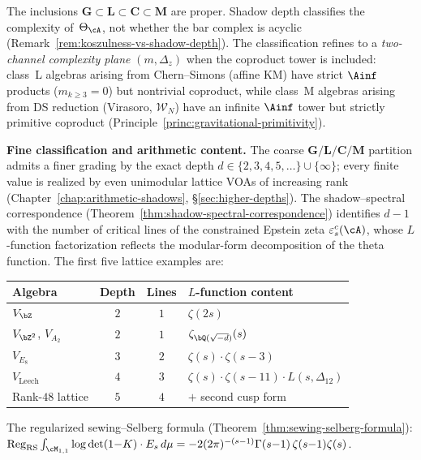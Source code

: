 \noindent
The inclusions $\mathbf{G} \subset \mathbf{L} \subset
\mathbf{C} \subset \mathbf{M}$ are proper. Shadow depth
classifies the complexity of~$\Theta_\cA$, not whether the
bar complex is acyclic
(Remark~\ref{rem:koszulness-vs-shadow-depth}).
The classification refines to a \emph{two-channel complexity plane}
$(m, \Delta_z)$ when the coproduct tower is included: class~L
algebras arising from Chern--Simons (affine KM) have strict
$\Ainf$ products ($m_{k \ge 3} = 0$) but nontrivial coproduct,
while class~M algebras arising from DS reduction (Virasoro,
$\mathcal{W}_N$) have an infinite $\Ainf$ tower but strictly
primitive coproduct
(Principle~\ref{princ:gravitational-primitivity}).

\medskip\noindent\textbf{Fine classification and arithmetic content.}
The coarse $\mathbf{G}/\mathbf{L}/\mathbf{C}/\mathbf{M}$
partition admits a finer grading by the exact depth
$d\in\{2,3,4,5,\ldots\}\cup\{\infty\}$; every finite value
is realized by even unimodular lattice VOAs of increasing rank
(Chapter~\ref{chap:arithmetic-shadows},
\S\ref{sec:higher-depths}). The shadow--spectral correspondence
(Theorem~\ref{thm:shadow-spectral-correspondence}) identifies
$d-1$ with the number of critical lines of the constrained
Epstein zeta $\varepsilon^c_s(\cA)$, whose $L$-function
factorization reflects the modular-form decomposition of the
theta function. The first five lattice examples are:

\begin{center}
\small
\renewcommand{\arraystretch}{1.1}
\begin{tabular}{@{}lccl@{}}
\toprule
\textbf{Algebra} & \textbf{Depth} & \textbf{Lines}
 & \textbf{$L$-function content} \\
\midrule
$V_{\bZ}$ & $2$ & $1$ & $\zeta(2s)$ \\
$V_{\bZ^2}$, $V_{A_2}$ & $2$ & $1$
 & $\zeta_{\bQ(\sqrt{-d})}(s)$ \\
$V_{E_8}$ & $3$ & $2$
 & $\zeta(s)\cdot\zeta(s{-}3)$ \\
$V_{\mathrm{Leech}}$ & $4$ & $3$
 & $\zeta(s)\cdot\zeta(s{-}11)\cdot L(s,\Delta_{12})$ \\
Rank-$48$ lattice & $5$ & $4$
 & $+$ second cusp form \\
\bottomrule
\end{tabular}
\end{center}

\noindent
The regularized sewing--Selberg formula
(Theorem~\ref{thm:sewing-selberg-formula}):
$\operatorname*{Reg}_{\mathrm{RS}}
\int_{\cM_{1,1}}\log\det(1{-}K)\cdot E_s\,d\mu
=-2(2\pi)^{-(s-1)}\Gamma(s{-}1)\,\zeta(s{-}1)\zeta(s)$.

